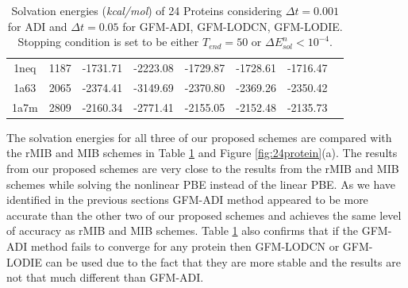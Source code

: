\begin{table}[!ht]
\begin{tabular}{ c c c c c c c c}
1neq & 1187 & -1731.71 & -2223.08 & -1729.87 & -1728.61 & -1716.47 \\
1a63 & 2065 & -2374.41 & -3149.69 & -2370.80 & -2369.26 & -2350.42 \\
1a7m & 2809 & -2160.34 & -2771.41 & -2155.05 & -2152.48 & -2135.73 \\ \hline
\end{tabular}
\caption{Solvation energies ({\it kcal/mol}) of 24 Proteins considering $\Delta t = 0.001$ for ADI and $\Delta t =0.05$ for GFM-ADI, GFM-LODCN, GFM-LODIE. Stopping condition is set to be either $T_{end}=50$ or $\Delta E^n_{sol}<10^{-4}$.}  
\label{tab:24protein}
\end{table}


The solvation energies for all three of our proposed schemes are compared  with the rMIB and MIB schemes in Table \ref{tab:24protein} and Figure \ref{fig:24protein}(a). The results from our proposed schemes are very close to the results from the rMIB and MIB schemes while solving the nonlinear PBE instead of the linear PBE. As we have identified in the previous sections GFM-ADI method appeared to be more accurate than the other two of our proposed schemes and achieves the same level of accuracy as rMIB and MIB schemes. Table \ref{tab:24protein} also confirms that if the GFM-ADI method fails to converge for any protein then GFM-LODCN or GFM-LODIE can be used due to the fact that they are more stable and the results are not that much different than GFM-ADI.   

